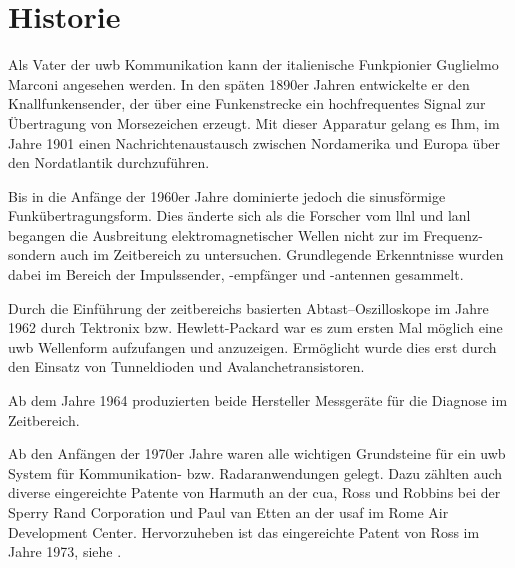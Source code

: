\begin{comment}
------------------------------------------------------------------------------------------
\end{comment}
\section{Historie}

Als Vater der \ac{uwb} Kommunikation kann der italienische Funkpionier Guglielmo Marconi angesehen werden. In den späten 1890er Jahren entwickelte er den Knallfunkensender, der über eine Funkenstrecke ein hochfrequentes Signal zur Übertragung von Morsezeichen erzeugt. Mit dieser Apparatur gelang es Ihm, im Jahre 1901 einen Nachrichtenaustausch zwischen Nordamerika und Europa über den Nordatlantik durchzuführen.\cite{fontana2004recent}


Bis in die Anfänge der 1960er Jahre dominierte jedoch die sinusförmige Funkübertragungsform. Dies änderte sich als die Forscher vom \ac{llnl} und \ac{lanl} begangen die Ausbreitung elektromagnetischer Wellen nicht zur im Frequenz- sondern auch im Zeitbereich zu untersuchen. Grundlegende Erkenntnisse wurden dabei im Bereich der Impulssender, -empfänger und -antennen gesammelt.\cite{eltaher2004positioning, fontana2004recent, lakkundi2006ultra, aiello2006ultra}

Durch die Einführung der zeitbereichs basierten Abtast--Oszilloskope im Jahre 1962 durch Tektronix bzw. Hewlett-Packard war es zum ersten Mal möglich eine \ac{uwb} Wellenform aufzufangen und anzuzeigen. Ermöglicht wurde dies erst durch den Einsatz von Tunneldioden und Avalanchetransistoren. \cite{fontana2004recent, lakkundi2006ultra, aiello2006ultra}

Ab dem Jahre 1964 produzierten beide Hersteller Messgeräte für die Diagnose im Zeitbereich. \cite{barrett2001technical}

Ab den Anfängen der 1970er Jahre waren alle wichtigen Grundsteine für ein \ac{uwb} System für Kommunikation- bzw. Radaranwendungen gelegt. Dazu zählten auch diverse eingereichte Patente von Harmuth an der \ac{cua}, Ross und Robbins bei der Sperry Rand Corporation und Paul van Etten an der \ac{usaf} im Rome Air Development Center.\cite{barrett2001technical, fontana2004recent, yang2004uwbcom} Hervorzuheben ist das eingereichte Patent von Ross im Jahre 1973, siehe \cite{g1973transmission}.

